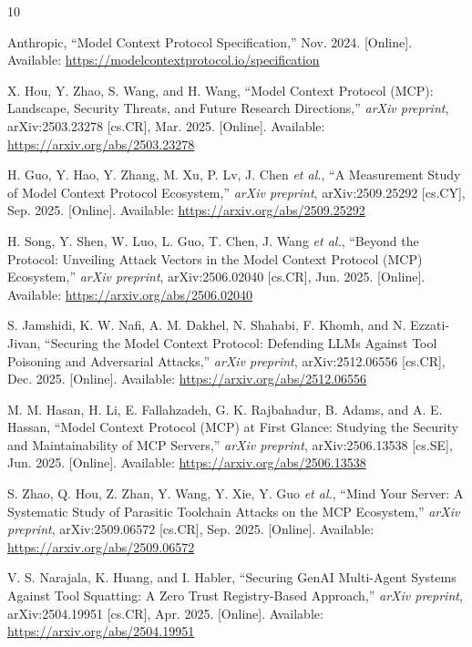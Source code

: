 \documentclass[conference]{IEEEtran}
\begin{document}
\begin{thebibliography}{10}

  Anthropic,
  ``Model Context Protocol Specification,''
  Nov. 2024. [Online]. Available: \url{https://modelcontextprotocol.io/specification}

  X. Hou, Y. Zhao, S. Wang, and H. Wang,
  ``Model Context Protocol (MCP): Landscape, Security Threats, and Future
  Research Directions,''
  \textit{arXiv preprint}, arXiv:2503.23278 [cs.CR], Mar. 2025.
  [Online]. Available: \url{https://arxiv.org/abs/2503.23278}

  H. Guo, Y. Hao, Y. Zhang, M. Xu, P. Lv, J. Chen \textit{et al.},
  ``A Measurement Study of Model Context Protocol Ecosystem,''
  \textit{arXiv preprint}, arXiv:2509.25292 [cs.CY], Sep. 2025.
  [Online]. Available: \url{https://arxiv.org/abs/2509.25292}

  H. Song, Y. Shen, W. Luo, L. Guo, T. Chen, J. Wang \textit{et al.},
  ``Beyond the Protocol: Unveiling Attack Vectors in the Model Context
  Protocol (MCP) Ecosystem,''
  \textit{arXiv preprint}, arXiv:2506.02040 [cs.CR], Jun. 2025.
  [Online]. Available: \url{https://arxiv.org/abs/2506.02040}

  S. Jamshidi, K. W. Nafi, A. M. Dakhel, N. Shahabi, F. Khomh,
  and N. Ezzati-Jivan,
  ``Securing the Model Context Protocol: Defending LLMs Against Tool
  Poisoning and Adversarial Attacks,''
  \textit{arXiv preprint}, arXiv:2512.06556 [cs.CR], Dec. 2025.
  [Online]. Available: \url{https://arxiv.org/abs/2512.06556}

  M. M. Hasan, H. Li, E. Fallahzadeh, G. K. Rajbahadur, B. Adams,
  and A. E. Hassan,
  ``Model Context Protocol (MCP) at First Glance: Studying the Security
  and Maintainability of MCP Servers,''
  \textit{arXiv preprint}, arXiv:2506.13538 [cs.SE], Jun. 2025.
  [Online]. Available: \url{https://arxiv.org/abs/2506.13538}

  S. Zhao, Q. Hou, Z. Zhan, Y. Wang, Y. Xie, Y. Guo \textit{et al.},
  ``Mind Your Server: A Systematic Study of Parasitic Toolchain Attacks on
  the MCP Ecosystem,''
  \textit{arXiv preprint}, arXiv:2509.06572 [cs.CR], Sep. 2025.
  [Online]. Available: \url{https://arxiv.org/abs/2509.06572}

  V. S. Narajala, K. Huang, and I. Habler,
  ``Securing GenAI Multi-Agent Systems Against Tool Squatting: A Zero
  Trust Registry-Based Approach,''
  \textit{arXiv preprint}, arXiv:2504.19951 [cs.CR], Apr. 2025.
  [Online]. Available: \url{https://arxiv.org/abs/2504.19951}


\end{thebibliography}
\end{document}
